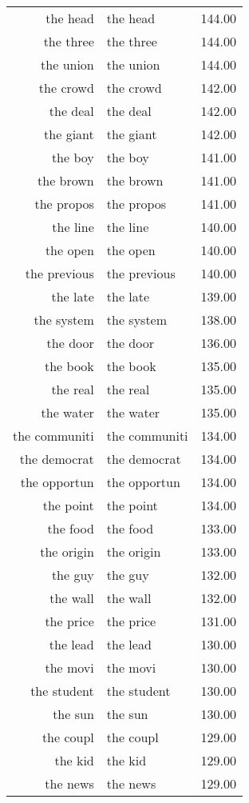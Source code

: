 \begin{table}[ht]
\begin{tabular}{rlr}
  the head & the head & 144.00 \\ 
  the three & the three & 144.00 \\ 
  the union & the union & 144.00 \\ 
  the crowd & the crowd & 142.00 \\ 
  the deal & the deal & 142.00 \\ 
  the giant & the giant & 142.00 \\ 
  the boy & the boy & 141.00 \\ 
  the brown & the brown & 141.00 \\ 
  the propos & the propos & 141.00 \\ 
  the line & the line & 140.00 \\ 
  the open & the open & 140.00 \\ 
  the previous & the previous & 140.00 \\ 
  the late & the late & 139.00 \\ 
  the system & the system & 138.00 \\ 
  the door & the door & 136.00 \\ 
  the book & the book & 135.00 \\ 
  the real & the real & 135.00 \\ 
  the water & the water & 135.00 \\ 
  the communiti & the communiti & 134.00 \\ 
  the democrat & the democrat & 134.00 \\ 
  the opportun & the opportun & 134.00 \\ 
  the point & the point & 134.00 \\ 
  the food & the food & 133.00 \\ 
  the origin & the origin & 133.00 \\ 
  the guy & the guy & 132.00 \\ 
  the wall & the wall & 132.00 \\ 
  the price & the price & 131.00 \\ 
  the lead & the lead & 130.00 \\ 
  the movi & the movi & 130.00 \\ 
  the student & the student & 130.00 \\ 
  the sun & the sun & 130.00 \\ 
  the coupl & the coupl & 129.00 \\ 
  the kid & the kid & 129.00 \\ 
  the news & the news & 129.00 \\ 

\end{tabular}
\end{table}
